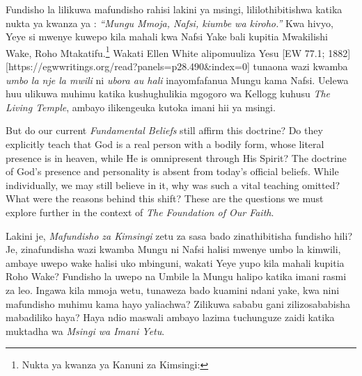 Fundisho la  lilikuwa mafundisho rahisi lakini ya msingi, lililothibitishwa katika nukta ya kwanza ya : \textit{“Mungu Mmoja, Nafsi, kiumbe wa kiroho.”} Kwa hivyo, Yeye si mwenye kuwepo kila mahali kwa Nafsi Yake bali kupitia Mwakilishi Wake, Roho Mtakatifu.\footnote{Nukta ya kwanza ya Kanuni za Kimsingi: } Wakati Ellen White alipomuuliza Yesu [EW 77.1; 1882][https://egwwritings.org/read?panels=p28.490&index=0] tunaona wazi kwamba \textit{umbo la nje la mwili} ni \textit{ubora au hali} inayomfafanua Mungu kama Nafsi. Uelewa huu ulikuwa muhimu katika kushughulikia mgogoro wa Kellogg kuhusu \textit{The Living Temple}, ambayo ilikengeuka kutoka imani hii ya msingi.


But do our current \textit{Fundamental Beliefs} still affirm this doctrine? Do they explicitly teach that God is a real person with a bodily form, whose literal presence is in heaven, while He is omnipresent through His Spirit? The doctrine of God’s presence and personality is absent from today’s official beliefs. While individually, we may still believe in it, why was such a vital teaching omitted? What were the reasons behind this shift? These are the questions we must explore further in the context of \textit{The Foundation of Our Faith}.


Lakini je, \textit{Mafundisho za Kimsingi} zetu za sasa bado zinathibitisha fundisho hili? Je, zinafundisha wazi kwamba Mungu ni Nafsi halisi mwenye umbo la kimwili, ambaye uwepo wake halisi uko mbinguni, wakati Yeye yupo kila mahali kupitia Roho Wake? Fundisho la uwepo na Umbile la Mungu halipo katika imani rasmi za leo. Ingawa kila mmoja wetu, tunaweza bado kuamini ndani yake, kwa nini mafundisho muhimu kama hayo yaliachwa? Zilikuwa sababu gani zilizosababisha mabadiliko haya? Haya ndio maswali ambayo lazima tuchunguze zaidi katika muktadha wa \textit{Msingi wa Imani Yetu}.






